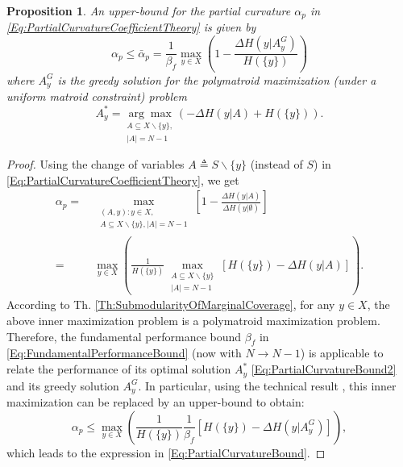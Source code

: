 \documentclass[letterpaper, 10 pt, conference]{ieeeconf}
\newtheorem{proposition}{Proposition}
\begin{document}
\begin{proposition}\label{Pr:PartialCurvatureBound}
An upper-bound for the partial curvature $\alpha_p$ in \eqref{Eq:PartialCurvatureCoefficientTheory} is given by  
\begin{equation}\label{Eq:PartialCurvatureBound}
    \alpha_p \leq \bar{\alpha}_p = \frac{1}{\beta_f} \max_{y\in X} \left(1-\frac{\Delta H(y \vert A^G_y)}{H(\{y\})}\right)
\end{equation}
where $A^G_y$ is the greedy solution for the polymatroid maximization (under a uniform matroid constraint) problem
\begin{equation}\label{Eq:PartialCurvatureBound2}
    A_y^* = \underset{\substack{A\subseteq X\backslash \{y\}, \\ \vert A \vert = N-1}}{\arg\max} \left(-\Delta H(y \vert A)+H(\{y\})\right).
\end{equation}
\end{proposition}
\begin{proof}
Using the change of variables $A \triangleq S\backslash \{y\}$ (instead of $S$) in \eqref{Eq:PartialCurvatureCoefficientTheory}, we get 
\begin{align}
\alpha_p =&\  
\max_{\substack{(A,y): y\in X, \\ A \subseteq X \backslash \{y\}, \vert A \vert = N-1}}\left[1-\frac{\Delta H(y \vert A) }{\Delta H(y \vert \emptyset)}\right]\\
=&\ 
\max_{y\in X} \left(\frac{1}{H(\{y\})}\max_{\substack{A \subseteq X \backslash \{y\}\\\vert A \vert = N-1}}\left[H(\{y\})-\Delta H(y \vert A)\right] \right).   
\end{align}
According to Th. \ref{Th:SubmodularityOfMarginalCoverage}, for any $y\in X$, the above inner maximization problem is a polymatroid maximization problem. Therefore, the fundamental performance bound $\beta_f$ in \eqref{Eq:FundamentalPerformanceBound} (now with $N\rightarrow N-1$) is applicable to relate the performance of its optimal solution $A_y^*$ \eqref{Eq:PartialCurvatureBound2} and its greedy solution $A_y^G$. In particular, using the technical result \cite[Lm. 2(b)]{WelikalaJ02021}, this inner maximization can be replaced by an upper-bound to obtain: 
\begin{equation*}
\alpha_p \leq  
\max_{y\in X} \left(\frac{1}{H(\{y\})}\frac{1}{\beta_f}\left[H(\{y\})-\Delta H(y \vert A_y^G)\right] \right),   
\end{equation*}
which leads to the expression in \eqref{Eq:PartialCurvatureBound}.
\end{proof}
\end{document}
